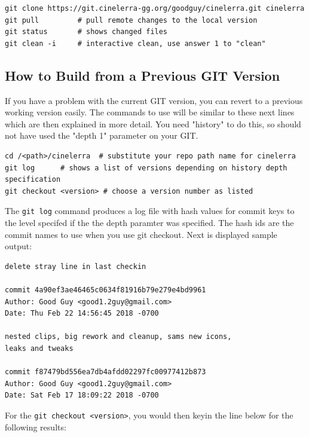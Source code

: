 \begin{lstlisting}[style=sh]
git clone https://git.cinelerra-gg.org/goodguy/cinelerra.git cinelerra
git pull         # pull remote changes to the local version
git status       # shows changed files
git clean -i     # interactive clean, use answer 1 to "clean"
\end{lstlisting}


\subsection{How to Build from a Previous GIT Version}%
\label{sub:how_to_build_from_a_previous_git_version}

If you have a problem with the current GIT version, you can revert
to a previous working version easily.  The commands to use will be
similar to these next lines which are then explained in more detail.
You need "history" to do this, so should not have used the "depth 1"
parameter on your GIT.
\strut
 
\begin{lstlisting}[style=sh]
cd /<path>/cinelerra  # substitute your repo path name for cinelerra
git log		 # shows a list of versions depending on history depth specification
git checkout <version> # choose a version number as listed
\end{lstlisting}

The \texttt{git log} command produces a log file with hash values
for commit keys to the level specifed if the the depth paramter
was specified. 
The hash ids are the commit names to use when you
use git checkout. Next is displayed sample output:

\begin{lstlisting}[style=nil]
delete stray line in last checkin

commit 4a90ef3ae46465c0634f81916b79e279e4bd9961
Author: Good Guy <good1.2guy@gmail.com>
Date: Thu Feb 22 14:56:45 2018 -0700

nested clips, big rework and cleanup, sams new icons,
leaks and tweaks

commit f87479bd556ea7db4afdd02297fc00977412b873
Author: Good Guy <good1.2guy@gmail.com>
Date: Sat Feb 17 18:09:22 2018 -0700
\end{lstlisting}

For the \texttt{git checkout <version>}, you would then keyin the
line below for the following results:

